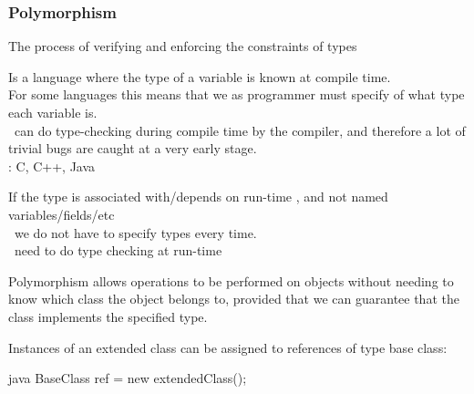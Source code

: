 \subsubsection{Polymorphism}
\begin{defnbox}\nospacing
  \begin{defn}
    The process of verifying and enforcing the constraints of types
  \end{defn}
\end{defnbox}
\begin{defnbox}\nospacing
  \begin{defn}
    Is a language where the type of a variable is known at compile time.\\
    For some languages this means that we as programmer must specify of what type each variable is.\\
    \Advantage\ can do type-checking during compile time by the compiler, and therefore a lot of trivial bugs are caught at a very early stage.\\
    : C, C++, Java
  \end{defn}
\end{defnbox}
\begin{defnbox}\nospacing
  \begin{defn}
     If the type is associated with/depends on run-time , and not named variables/fields/etc\\
     \Advantage\ we do not have to specify types every time.\\
     \Drawback\ need to do type checking at run-time
  \end{defn}
\end{defnbox}
\label{subsubsec:Polymorphism}
\begin{defnbox}\nospacing
  \begin{defn}[Polymorphism]\label{defn:polymorphism}
    Polymorphism allows operations to be performed on objects without needing to know which class the object belongs to,
    provided that we can guarantee that the class implements the specified type.
  \end{defn}
\end{defnbox}
\begin{defnbox}\nospacing
  \begin{defn}
    Instances of an extended class can be assigned to references of type base
    class:
    \begin{mintlinebox}{java}
      BaseClass ref = new extendedClass();
    \end{mintlinebox}
  \end{defn}
\end{defnbox}

